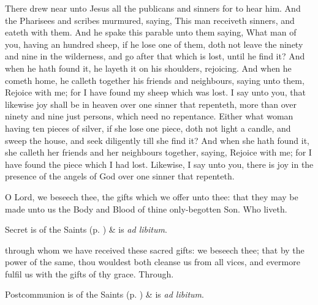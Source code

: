  There drew near unto Jesus all the publicans and sinners for to hear him. And the Pharisees and scribes murmured, saying, This man receiveth sinners, and eateth with them. And he spake this parable unto them saying, What man of you, having an hundred sheep, if he lose one of them, doth not leave the ninety and nine in the wilderness, and go after that which is lost, until he find it? And when he hath found it, he layeth it on his shoulders, rejoicing. And when he cometh home, he calleth together his friends and neighbours, saying unto them, Rejoice with me; for I have found my sheep which was lost. I say unto you, that likewise joy shall be in heaven over one sinner that repenteth, more than over ninety and nine just persons, which need no repentance. Either what woman having ten pieces of silver, if she lose one piece, doth not light a candle, and sweep the house, and seek diligently till she find it? And when she hath found it, she calleth her friends and her neighbours together, saying, Rejoice with me; for I have found the piece which I had lost. Likewise, I say unto you, there is joy in the presence of the angels of God over one sinner that repenteth.


\secret\label{TrinityIIISecret}
 O Lord, we beseech thee, the gifts which we offer unto thee: that they may be made unto us the Body and Blood of thine only-begotten Son. Who liveth.

\begin{rubric}
     Secret is of the Saints (p. \pageref{SPSaints}) \&  is \emph{ad libitum}.
\end{rubric}


\postcommunion\label{TrinityIIIPostcommunion}
 through whom we have received these sacred gifts: we beseech thee; that by the power of the same, thou wouldest both cleanse us from all vices, and evermore fulfil us with the gifts of thy grace. Through.

\begin{rubric}
     Postcommunion is of the Saints (p. \pageref{SPSaints}) \&  is \emph{ad libitum}.
\end{rubric}


